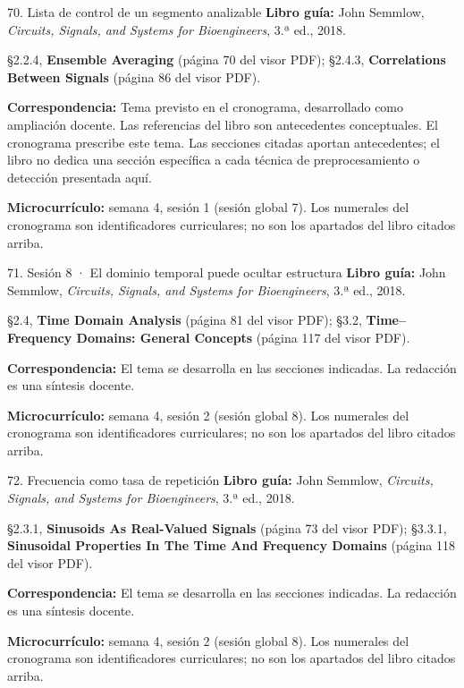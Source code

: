 \documentclass[
  10pt,
  ignorenonframetext,
  aspectratio=169,
  spanish,
]{beamer}
\begin{document}
\begin{frame}{70. Lista de control de un segmento analizable}
\label{lista-de-control-de-un-segmento-analizable}
\textbf{Libro guía:} John Semmlow, \emph{Circuits, Signals, and Systems
for Bioengineers}, 3.ª ed., 2018.

§2.2.4, \textbf{Ensemble Averaging} (página 70 del visor PDF); §2.4.3,
\textbf{Correlations Between Signals} (página 86 del visor PDF).

\textbf{Correspondencia:} Tema previsto en el cronograma, desarrollado
como ampliación docente. Las referencias del libro son antecedentes
conceptuales. El cronograma prescribe este tema. Las secciones citadas
aportan antecedentes; el libro no dedica una sección específica a cada
técnica de preprocesamiento o detección presentada aquí.

\textbf{Microcurrículo:} semana 4, sesión 1 (sesión global 7). Los
numerales del cronograma son identificadores curriculares; no son los
apartados del libro citados arriba.
\end{frame}

\begin{frame}{71. Sesión 8 · El dominio temporal puede ocultar
estructura}
\label{sesiuxf3n-8-el-dominio-temporal-puede-ocultar-estructura}
\textbf{Libro guía:} John Semmlow, \emph{Circuits, Signals, and Systems
for Bioengineers}, 3.ª ed., 2018.

§2.4, \textbf{Time Domain Analysis} (página 81 del visor PDF); §3.2,
\textbf{Time--Frequency Domains: General Concepts} (página 117 del visor
PDF).

\textbf{Correspondencia:} El tema se desarrolla en las secciones
indicadas. La redacción es una síntesis docente.

\textbf{Microcurrículo:} semana 4, sesión 2 (sesión global 8). Los
numerales del cronograma son identificadores curriculares; no son los
apartados del libro citados arriba.
\end{frame}

\begin{frame}{72. Frecuencia como tasa de repetición}
\label{frecuencia-como-tasa-de-repeticiuxf3n}
\textbf{Libro guía:} John Semmlow, \emph{Circuits, Signals, and Systems
for Bioengineers}, 3.ª ed., 2018.

§2.3.1, \textbf{Sinusoids As Real-Valued Signals} (página 73 del visor
PDF); §3.3.1, \textbf{Sinusoidal Properties In The Time And Frequency
Domains} (página 118 del visor PDF).

\textbf{Correspondencia:} El tema se desarrolla en las secciones
indicadas. La redacción es una síntesis docente.

\textbf{Microcurrículo:} semana 4, sesión 2 (sesión global 8). Los
numerales del cronograma son identificadores curriculares; no son los
apartados del libro citados arriba.
\end{frame}
\end{document}

